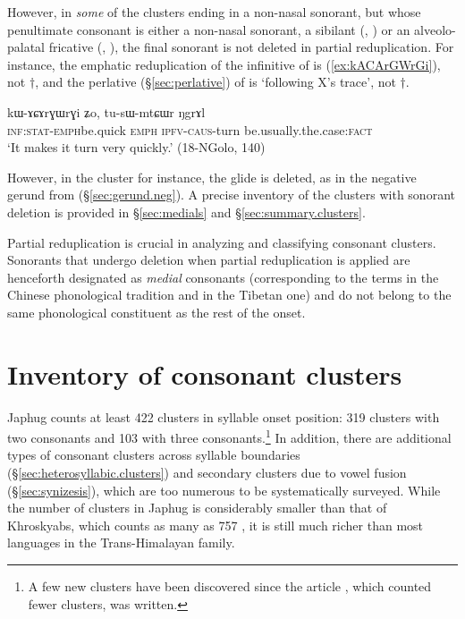 However, in \textit{some} of the clusters ending in a non-nasal sonorant, but whose penultimate consonant is either a non-nasal sonorant, a sibilant (, ) or an alveolo-palatal fricative (, ), the final sonorant is not deleted in partial reduplication. For instance, the emphatic reduplication of the infinitive of  is  (\ref{ex:kACArGWrGi}), not $\dagger$, and the perlative (§\ref{sec:perlative}) of  is   `following X's trace', not $\dagger$.

\begin{exe}
	\ex \label{ex:kACArGWrGi}
	\gll kɯ-ɤɕɤrɣɯ\redp{}rɣi ʑo, tu-sɯ-mtɕɯr ŋgrɤl \\
	\textsc{inf}:\textsc{stat}-\textsc{emph}\redp{}be.quick \textsc{emph} \textsc{ipfv}-\textsc{caus}-turn be.usually.the.case:\textsc{fact} \\
	\glt `It makes it turn very quickly.' (18-NGolo, 140)
\end{exe}

However, in the cluster  for instance, the glide  is deleted, as in the negative gerund  from  (§\ref{sec:gerund.neg}). A precise inventory of the clusters with sonorant deletion is provided in  §\ref{sec:medials}  and §\ref{sec:summary.clusters}.


Partial reduplication is crucial in analyzing and classifying consonant clusters. Sonorants that undergo deletion when partial reduplication is applied are henceforth designated as \textit{medial} consonants (corresponding to the terms  in the Chinese phonological tradition and  in the Tibetan one) and do not belong to the same phonological constituent as the rest of the onset.  


\section{Inventory of consonant clusters} \label{sec:inventory.clusters}
Japhug counts at least 422 clusters in syllable onset position:  319 clusters with two consonants and 103 with three consonants.\footnote{A few new clusters have been discovered since the article \citet{jacques19ipa}, which counted fewer clusters, was written. } In addition, there are additional types of consonant clusters across syllable boundaries (§\ref{sec:heterosyllabic.clusters}) and secondary clusters due to vowel fusion (§\ref{sec:synizesis}), which are too numerous to be systematically surveyed. While the number of clusters in Japhug is considerably smaller than that of Khroskyabs, which counts as many as 757 \citep[101]{lai17khroskyabs}, it is still much richer than most languages in the Trans-Himalayan family. 

